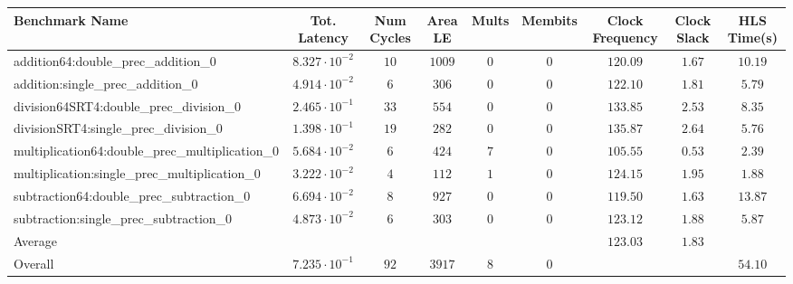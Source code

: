 \begin{tabular}{|l|c|c|c|c|c|c|c|c|}
\hline
Benchmark Name                                   & Tot. Latency            & Num Cycles & Area LE  & Mults & Membits & Clock Frequency & Clock Slack & HLS Time(s) \\
\hline
addition64:double\_prec\_addition\_0             & $ 8.327 \cdot 10^{-2} $ & $ 10     $ & $ 1009 $ & $ 0 $ & $ 0   $ & $ 120.09      $ & $ 1.67    $ & $ 10.19   $ \\
addition:single\_prec\_addition\_0               & $ 4.914 \cdot 10^{-2} $ & $ 6      $ & $ 306  $ & $ 0 $ & $ 0   $ & $ 122.10      $ & $ 1.81    $ & $ 5.79    $ \\
division64SRT4:double\_prec\_division\_0         & $ 2.465 \cdot 10^{-1} $ & $ 33     $ & $ 554  $ & $ 0 $ & $ 0   $ & $ 133.85      $ & $ 2.53    $ & $ 8.35    $ \\
divisionSRT4:single\_prec\_division\_0           & $ 1.398 \cdot 10^{-1} $ & $ 19     $ & $ 282  $ & $ 0 $ & $ 0   $ & $ 135.87      $ & $ 2.64    $ & $ 5.76    $ \\
multiplication64:double\_prec\_multiplication\_0 & $ 5.684 \cdot 10^{-2} $ & $ 6      $ & $ 424  $ & $ 7 $ & $ 0   $ & $ 105.55      $ & $ 0.53    $ & $ 2.39    $ \\
multiplication:single\_prec\_multiplication\_0   & $ 3.222 \cdot 10^{-2} $ & $ 4      $ & $ 112  $ & $ 1 $ & $ 0   $ & $ 124.15      $ & $ 1.95    $ & $ 1.88    $ \\
subtraction64:double\_prec\_subtraction\_0       & $ 6.694 \cdot 10^{-2} $ & $ 8      $ & $ 927  $ & $ 0 $ & $ 0   $ & $ 119.50      $ & $ 1.63    $ & $ 13.87   $ \\
subtraction:single\_prec\_subtraction\_0         & $ 4.873 \cdot 10^{-2} $ & $ 6      $ & $ 303  $ & $ 0 $ & $ 0   $ & $ 123.12      $ & $ 1.88    $ & $ 5.87    $ \\
\hline
Average                                          & $                     $ & $        $ & $      $ & $   $ & $     $ & $ 123.03      $ & $ 1.83    $ & $         $ \\
\hline
Overall                                          & $ 7.235 \cdot 10^{-1} $ & $ 92     $ & $ 3917 $ & $ 8 $ & $ 0   $ & $             $ & $         $ & $ 54.10   $ \\
\hline
\end{tabular}
